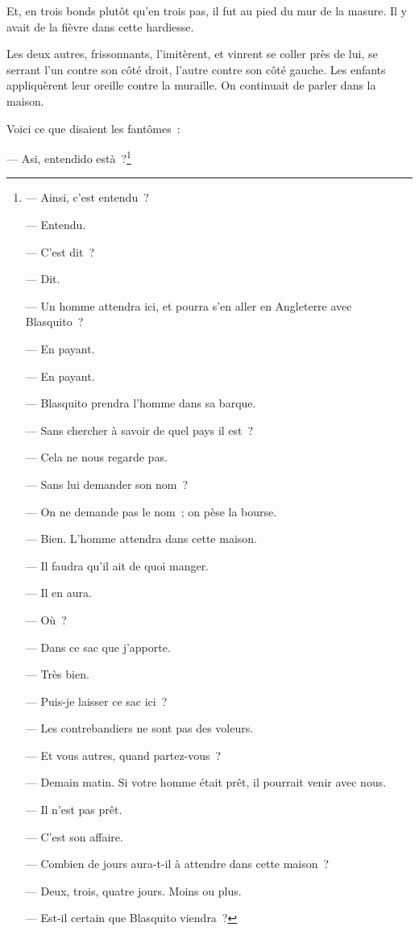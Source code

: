 \documentclass[french,twoside]{book} %
\begin{document}
Et, en trois bonds plutôt qu’en trois pas, il fut au pied du mur de la masure. Il y avait de la fièvre dans cette hardiesse.\par
Les deux autres, frissonnants, l’imitèrent, et vinrent se coller près de lui, se serrant l’un contre son côté droit, l’autre contre son côté gauche. Les enfants appliquèrent leur oreille contre la muraille. On continuait de parler dans la maison.\par
Voici ce que disaient les fantômes :\par
— Asi, entendido està ?\footnote{ \noindent — Ainsi, c’est entendu ?\par
 — Entendu.\par
 — C’est dit ?\par
 — Dit.\par
 — Un homme attendra ici, et pourra s’en aller en Angleterre avec Blasquito ?\par
 — En payant.\par
 — En payant.\par
 — Blasquito prendra l’homme dans sa barque.\par
 — Sans chercher à savoir de quel pays il est ?\par
 — Cela ne nous regarde pas.\par
 — Sans lui demander son nom ?\par
 — On ne demande pas le nom ; on pèse la bourse.\par
 — Bien. L’homme attendra dans cette maison.\par
 — Il faudra qu’il ait de quoi manger.\par
 — Il en aura.\par
 — Où ?\par
 — Dans ce sac que j’apporte.\par
 — Très bien.\par
 — Puis-je laisser ce sac ici ?\par
 — Les contrebandiers ne sont pas des voleurs.\par
 — Et vous autres, quand partez-vous ?\par
 — Demain matin. Si votre homme était prêt, il pourrait venir avec nous.\par
 — Il n’est pas prêt.\par
 — C’est son affaire.\par
 — Combien de jours aura-t-il à attendre dans cette maison ?\par
 — Deux, trois, quatre jours. Moins ou plus.\par
 — Est-il certain que Blasquito viendra ?\par
}
\end{document}
